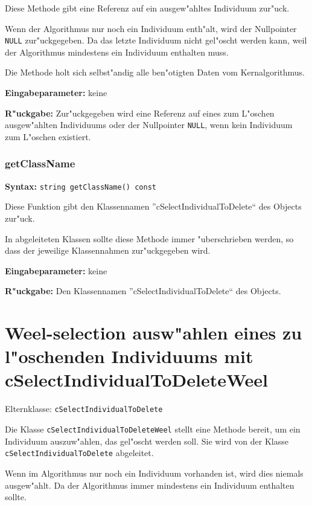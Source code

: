 Diese Methode gibt eine Referenz auf ein ausgew"ahltes Individuum zur"uck.

Wenn der Algorithmus nur noch ein Individuum enth"alt, wird der Nullpointer \verb|NULL| zur"uckgegeben. Da das letzte Individuum nicht gel"oscht werden kann, weil der Algorithmus mindestens ein Individuum enthalten muss.

Die Methode holt sich selbst"andig alle ben"otigten Daten vom Kernalgorithmus.

\bigskip\noindent
\textbf{Eingabeparameter:} keine

\bigskip\noindent
\textbf{R"uckgabe:} Zur"uckgegeben wird eine Referenz auf eines zum L"oschen ausgew"ahlten Individuums oder der Nullpointer \verb|NULL|, wenn kein Individuum zum L"oschen existiert.


\subsubsection{getClassName}

\textbf{Syntax:} \verb|string getClassName() const|

\bigskip\noindent
Diese Funktion gibt den Klassennamen ''cSelectIndividualToDelete`` des Objects zur"uck.

In abgeleiteten Klassen sollte diese Methode immer "uberschrieben werden, so dass der jeweilige Klassennahmen zur"uckgegeben wird.

\bigskip\noindent
\textbf{Eingabeparameter:} keine

\bigskip\noindent
\textbf{R"uckgabe:} Den Klassennamen ''cSelectIndividualToDelete`` des Objects.



\section{Weel-selection ausw"ahlen eines zu l"oschenden Individuums mit cSelectIndividualToDeleteWeel}
\label{secIndividualDeletionSelectionWeel}

Elternklasse: \verb|cSelectIndividualToDelete|

\bigskip\noindent
Die Klasse \verb|cSelectIndividualToDeleteWeel| stellt eine Methode bereit, um ein Individuum auszuw"ahlen, das gel"oscht werden soll. Sie wird von der Klasse \verb|cSelectIndividualToDelete| abgeleitet.

Wenn im Algorithmus nur noch ein Individuum vorhanden ist, wird dies niemals ausgew"ahlt. Da der Algorithmus immer mindestens ein Individuum enthalten sollte.

